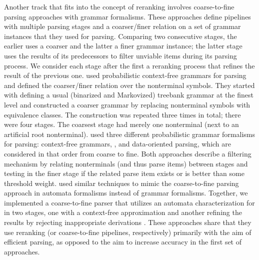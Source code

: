 \documentclass[../document.tex]{subfiles}
\begin{document}
    Another track that fits into the concept of reranking involves coarse-to-fine parsing approaches with grammar formalisms.
    These approaches define pipelines with multiple parsing stages and a coarser/finer relation on a set of grammar instances that they used for parsing.
    Comparing two consecutive stages, the earlier uses a coarser and the latter a finer grammar instance; the latter stage uses the results of its predecessors to filter unviable items during its parsing process.
    We consider each stage after the first a reranking process that refines the result of the previous one.
     used probabilistic context-free grammars for parsing and defined the coarser/finer relation over the nonterminal symbols.
    They started with defining a usual (binarized and Markovized) treebank grammar at the finest level and constructed a coarser grammar by replacing nonterminal symbols with equivalence classes.
    The construction was repeated three times in total; there were four stages.
    The coarsest stage had merely one nonterminal (next to an artificial root nonterminal).
     used three different probabilistic grammar formalisms for parsing: context-free grammars, , and data-oriented parsing, which are considered in that order from coarse to fine.
    Both approaches describe a filtering mechanism by relating nonterminals (and thus parse items) between stages and testing in the finer stage if the related parse item exists or is better than some threshold weight.
     used similar techniques to mimic the coarse-to-fine parsing approach in automata formalisms instead of grammar formalisms.
    Together, we implemented a coarse-to-fine parser that utilizes an automata characterization for  in two stages, one with a context-free approximation and another refining the results by rejecting inappropriate derivations \citep{RupDen19}.
    These approaches share that they use reranking (or coarse-to-fine pipelines, respectively) primarily with the aim of efficient parsing, as opposed to the aim to increase accuracy in the first set of approaches.
\end{document}
